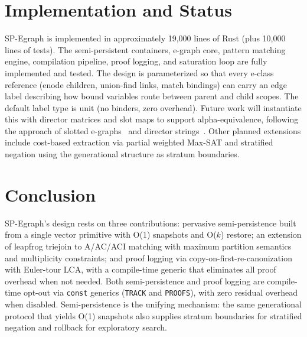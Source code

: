 \documentclass[sigplan,nonacm]{acmart}
\begin{document}
\section{Implementation and Status}

SP-Egraph is implemented in approximately 19{,}000 lines of Rust (plus 10{,}000 lines of tests).
The semi-persistent containers, e-graph core, pattern matching
engine, compilation pipeline, proof logging, and saturation loop are
fully implemented and tested.  The design is parameterized so that
every e-class reference (enode children, union-find links, match
bindings) can carry an edge label describing how bound variables
route between parent and child scopes.  The default label type is
unit (no binders, zero overhead).  Future work will instantiate this
with director matrices and slot maps to support alpha-equivalence,
following the approach of slotted e-graphs~\cite{slotted} and
director strings~\cite{sinot}.  Other planned extensions include
cost-based extraction via partial weighted Max-SAT and stratified
negation using the generational structure as stratum boundaries.

\section{Conclusion}

SP-Egraph's design rests on three contributions: pervasive
semi-persistence built from a single vector primitive with O(1)
snapshots and O($k$) restore; an extension of leapfrog triejoin to
A/AC/ACI matching with maximum partition semantics and multiplicity
constraints; and proof logging via copy-on-first-re-canonization
with Euler-tour LCA, with a compile-time generic that eliminates
all proof overhead when not needed.  Both semi-persistence and proof
logging are compile-time opt-out via \texttt{const} generics
(\texttt{TRACK} and \texttt{PROOFS}), with zero residual overhead
when disabled.  Semi-persistence is the
unifying mechanism: the same generational protocol that yields O(1)
snapshots also supplies stratum boundaries for stratified negation
and rollback for exploratory search.
\end{document}
